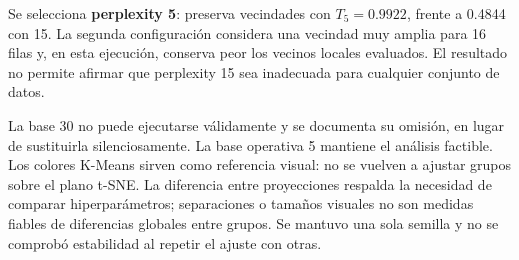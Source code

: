 \documentclass[11pt]{article}
\begin{document}
Se selecciona \textbf{perplexity 5}: preserva vecindades con $T_5=0.9922$,
frente a 0.4844 con 15. La segunda configuración considera una vecindad
muy amplia para 16 filas y, en esta ejecución, conserva peor los vecinos
locales evaluados. El resultado no permite afirmar que perplexity 15 sea
inadecuada para cualquier conjunto de datos.

La base 30 no puede ejecutarse válidamente y se documenta su omisión,
en lugar de sustituirla silenciosamente. La base operativa 5 mantiene el
análisis factible. Los colores K-Means sirven como referencia visual:
no se vuelven a ajustar grupos sobre el plano t-SNE.
La diferencia entre proyecciones respalda la necesidad de comparar
hiperparámetros; separaciones o tamaños visuales no son medidas fiables
de diferencias globales entre grupos. Se mantuvo una sola semilla y no se
comprobó estabilidad al repetir el ajuste con otras.
\FloatBarrier
\clearpage
\end{document}

